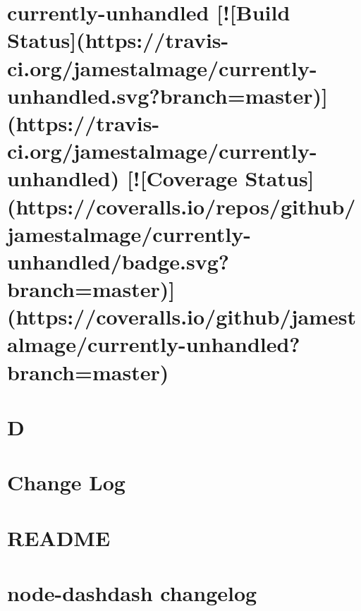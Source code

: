 \documentclass[twoside]{book}
\newcommand{\+}{\discretionary{\mbox{\scriptsize$\hookleftarrow$}}{}{}}
\begin{document}
\chapter{currently-\/unhandled \mbox{[}!\mbox{[}Build Status\mbox{]}(https\+://travis-\/ci.org/jamestalmage/currently-\/unhandled.svg?branch=master)\mbox{]}(https\+://travis-\/ci.org/jamestalmage/currently-\/unhandled) \mbox{[}!\mbox{[}Coverage Status\mbox{]}(https\+://coveralls.io/repos/github/jamestalmage/currently-\/unhandled/badge.svg?branch=master)\mbox{]}(https\+://coveralls.io/github/jamestalmage/currently-\/unhandled?branch=master)}
\label{md__c_1_workspace_demo_src_main_script_node_modules_currently-unhandled_readme}

\chapter{D}
\label{md__c_1_workspace_demo_src_main_script_node_modules_d__r_e_a_d_m_e}

\chapter{Change Log}
\label{md__c_1_workspace_demo_src_main_script_node_modules_damerau-levenshtein__c_h_a_n_g_e_l_o_g}

\chapter{R\+E\+A\+D\+ME}
\label{md__c_1_workspace_demo_src_main_script_node_modules_damerau-levenshtein__r_e_a_d_m_e}

\chapter{node-\/dashdash changelog}
\label{md__c_1_workspace_demo_src_main_script_node_modules_dashdash__c_h_a_n_g_e_s}

\end{document}
